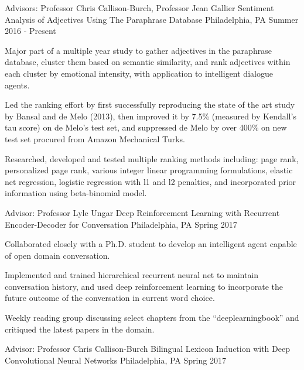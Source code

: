 \begin{cventries}
  \cventry
    {Advisors: Professor Chris Callison-Burch, Professor Jean Gallier}
    {Sentiment Analysis of Adjectives Using The Paraphrase Database}
    {Philadelphia, PA}
    {Summer 2016 - Present}
    {
      \begin{cvitems}
        \item {Major part of a multiple year study to gather adjectives in the paraphrase database, cluster them based on semantic similarity, and rank adjectives within each cluster by emotional intensity, with application to intelligent dialogue agents.}
        \item {Led the ranking effort by first successfully reproducing the state of the art study by Bansal and de Melo (2013), then improved it by 7.5\% (measured by Kendall's tau score) on de Melo’s test set, and suppressed de Melo by over 400\% on new test set procured from Amazon Mechanical Turks.}
        \item {Researched, developed and tested multiple ranking methods including: page rank, personalized page rank, various integer linear programming formulations, elastic net regression, logistic regression with l1 and l2 penalties, and incorporated prior information using beta-binomial model.}
      \end{cvitems}
    }
  \cventry
    {Advisor: Professor Lyle Ungar}
    {Deep Reinforcement Learning with Recurrent Encoder-Decoder for Conversation}
    {Philadelphia, PA}
    {Spring 2017}
    {
      \begin{cvitems}
        \item {Collaborated closely with a Ph.D. student to develop an intelligent agent capable of open domain conversation.}
        \item {Implemented and trained hierarchical recurrent neural net to maintain conversation history, and used deep reinforcement learning to incorporate the future outcome of the conversation in current word choice.}
        \item {Weekly reading group discussing select chapters from the “deeplearningbook” and critiqued the latest papers in the domain.}
      \end{cvitems}
    }
  \cventry
    {Advisor: Professor Chris Callison-Burch}
    {Bilingual Lexicon Induction with Deep Convolutional Neural Networks}
    {Philadelphia, PA}
    {Spring 2017}
    {
      \begin{cvitems}

\end{cvitems}}
\end{cventries}
